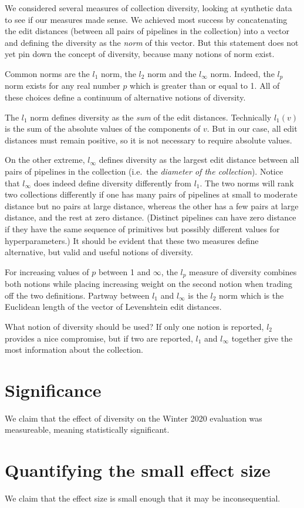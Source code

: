\documentclass{article}
\begin{document}
  We considered several measures of collection diversity, looking at
  synthetic data to see if our measures made sense.  We achieved most
  success by concatenating the edit distances (between all pairs of
  pipelines in the collection) into a vector and defining the
  diversity as the \emph{norm} of this vector.  But this statement
  does not yet pin down the concept of diversity, because many notions
  of norm exist.

  Common norms are the $l_1$ norm, the $l_2$ norm and the $l_\infty$
  norm.  Indeed, the $l_p$ norm exists for any real number $p$ which
  is greater than or equal to 1.  All of these choices define a
  continuum of alternative notions of diversity.

  The $l_1$ norm defines diversity as the \emph{sum} of the edit
  distances.  Technically $l_1(v)$ is the sum of the absolute values
  of the components of $v$.  But in our case, all edit distances must
  remain positive, so it is not necessary to require absolute values.

  On the other extreme, $l_\infty$ defines diversity as the largest
  edit distance between all pairs of pipelines in the collection
  (i.e.\ the \emph{diameter of the collection}).  Notice that
  $l_\infty$ does indeed define diversity differently from $l_1$.  The
  two norms will rank two collections differently if one has many
  pairs of pipelines at small to moderate distance but no pairs at
  large distance, whereas the other has a few pairs at large distance,
  and the rest at zero distance.  (Distinct pipelines can have zero
  distance if they have the same sequence of primitives but possibly
  different values for hyperparameters.)  It should be evident that
  these two measures define alternative, but valid and useful notions
  of diversity.

  For increasing values of $p$ between 1 and $\infty$, the $l_p$
  measure of diversity combines both notions while placing increasing
  weight on the second notion when trading off the two definitions.
  Partway between $l_1$ and $l_\infty$ is the $l_2$ norm which is the
  Euclidean length of the vector of Levenshtein edit distances.

  What notion of diversity should be used?  If only one notion is
  reported, $l_2$ provides a nice compromise, but if two are reported,
  $l_1$ and $l_\infty$ together give the most information about the
  collection.

  \section{Significance}
  We claim that the effect of diversity on the Winter 2020 evaluation
  was measureable, meaning statistically significant.

  \section{Quantifying the small effect size}
  We claim that the effect size is small enough that it may be
  inconsequential.
  
  
\end{document}
